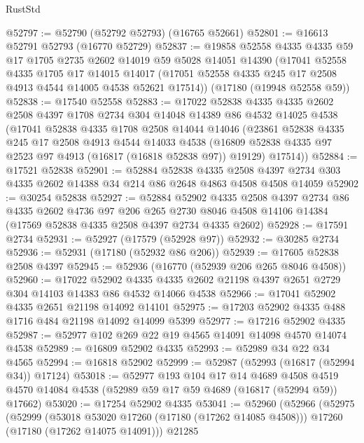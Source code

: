 \begin{lexlean}{RustStd}
\begin{coremodule}
@52797 := @52790 (@52792 @52793) (@16765 @52661)
@52801 := @16613 @52791 @52793 (@16770 @52729)
@52837 := @19858
    @52558
    @4335
    @4335
    @59
    @17
    @1705
    @2735
    @2602
    @14019
    @59
    @5028
    @14051
    @14390
    (@17041
      @52558
      @4335
      @1705
      @17
      @14015
      @14017
      (@17051 @52558 @4335 @245 @17 @2508 @4913 @4544 @14005 @4538 @52621 @17514))
    (@17180 (@19948 @52558 @59))
@52838 := @17540 @52558
@52883 := @17022
    @52838
    @4335
    @4335
    @2602
    @2508
    @4397
    @1708
    @2734
    @304
    @14048
    @14389
    @86
    @4532
    @14025
    @4538
    (@17041
      @52838
      @4335
      @1708
      @2508
      @14044
      @14046
      (@23861
        @52838
        @4335
        @245
        @17
        @2508
        @4913
        @4544
        @14033
        @4538
        (@16809 @52838 @4335 @97 @2523 @97 @4913 (@16817 (@16818 @52838 @97)) @19129)
        @17514))
@52884 := @17521 @52838
@52901 := @52884
    @52838
    @4335
    @2508
    @4397
    @2734
    @303
    @4335
    @2602
    @14388
    @34
    @214
    @86
    @2648
    @4863
    @4508
    @4508
    @14059
@52902 := @30254 @52838
@52927 := @52884
    @52902
    @4335
    @2508
    @4397
    @2734
    @86
    @4335
    @2602
    @4736
    @97
    @206
    @265
    @2730
    @8046
    @4508
    @14106
    @14384
    (@17569 @52838 @4335 @2508 @4397 @2734 @4335 @2602)
@52928 := @17591 @2734
@52931 := @52927 (@17579 (@52928 @97))
@52932 := @30285 @2734
@52936 := @52931 (@17180 (@52932 @86 @206))
@52939 := @17605 @52838 @2508 @4397
@52945 := @52936 (@16770 (@52939 @206 @265 @8046 @4508))
@52960 := @17022
    @52902
    @4335
    @4335
    @2602
    @21198
    @4397
    @2651
    @2729
    @304
    @14103
    @14383
    @86
    @4532
    @14066
    @4538
@52966 := @17041 @52902 @4335 @2651 @21198 @14092 @14101
@52975 := @17203 @52902 @4335 @488 @1716 @484 @21198 @14092 @14099 @5399
@52977 := @17216 @52902 @4335
@52987 := @52977 @102 @269 @22 @19 @4565 @14091 @14098 @4570 @14074 @4538
@52989 := @16809 @52902 @4335
@52993 := @52989 @34 @22 @34 @4565
@52994 := @16818 @52902
@52999 := @52987 (@52993 (@16817 (@52994 @34)) @17124)
@53018 := @52977
    @193
    @104
    @17
    @14
    @4689
    @4508
    @4519
    @4570
    @14084
    @4538
    (@52989 @59 @17 @59 @4689 (@16817 (@52994 @59)) @17662)
@53020 := @17254 @52902 @4335
@53041 := @52960
    (@52966
      (@52975
        (@52999
          (@53018 @53020 @17260 (@17180 (@17262 @14085 @4508)))
          @17260
          (@17180 (@17262 @14075 @14091)))
        @21285

\end{coremodule}
\end{lexlean}
